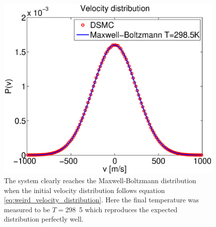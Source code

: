 \begin{figure}[h]
\begin{center}
\includegraphics[width=\textwidth, trim=0cm 0cm 0cm 0cm, clip]{DSMC/figures/velocity_distribution.eps}
\end{center}
\caption{The system clearly reaches the Maxwell-Boltzmann distribution when the initial velocity distribution follows equation \ref{eq:weird_velocity_distribution}. Here the final temperature was measured to be $T=$\unit{298.5}{\kelvin} which reproduces the expected distribution perfectly well.}
\label{fig:velocity_distribution}
\end{figure}
